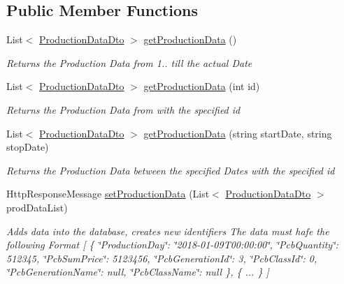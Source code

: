 \subsection*{Public Member Functions}
\begin{DoxyCompactItemize}
\item 
List$<$ \hyperlink{classkpi_mvc_api_1_1_data_transfer_objects_1_1_production_data_dto}{Production\+Data\+Dto} $>$ \hyperlink{classkpi_mvc_api_1_1_controllers_1_1_kpidata_controller_a0ab15672f7d3b5a077a8c4b0612feab8}{get\+Production\+Data} ()
\begin{DoxyCompactList}\small\item\em Returns the Production Data from 1.. till the actual Date \end{DoxyCompactList}\item 
List$<$ \hyperlink{classkpi_mvc_api_1_1_data_transfer_objects_1_1_production_data_dto}{Production\+Data\+Dto} $>$ \hyperlink{classkpi_mvc_api_1_1_controllers_1_1_kpidata_controller_a2cc4fffc5f66a92f16f917715cb36d0e}{get\+Production\+Data} (int id)
\begin{DoxyCompactList}\small\item\em Returns the Production Data from with the specified id \end{DoxyCompactList}\item 
List$<$ \hyperlink{classkpi_mvc_api_1_1_data_transfer_objects_1_1_production_data_dto}{Production\+Data\+Dto} $>$ \hyperlink{classkpi_mvc_api_1_1_controllers_1_1_kpidata_controller_a27722d65abe0781d4b670c84c2e07a76}{get\+Production\+Data} (string start\+Date, string stop\+Date)
\begin{DoxyCompactList}\small\item\em Returns the Production Data between the specified Dates with the specified id \end{DoxyCompactList}\item 
Http\+Response\+Message \hyperlink{classkpi_mvc_api_1_1_controllers_1_1_kpidata_controller_a7f6c6c359f37a9b9a83d481b5c26a037}{set\+Production\+Data} (List$<$ \hyperlink{classkpi_mvc_api_1_1_data_transfer_objects_1_1_production_data_dto}{Production\+Data\+Dto} $>$ prod\+Data\+List)
\begin{DoxyCompactList}\small\item\em Adds data into the database, creates new identifiers The data must hafe the following Format \mbox{[} \{ \char`\"{}\+Production\+Day\char`\"{}\+: \char`\"{}2018-\/01-\/09\+T00\+:00\+:00\char`\"{}, \char`\"{}\+Pcb\+Quantity\char`\"{}\+: 512345, \char`\"{}\+Pcb\+Sum\+Price\char`\"{}\+: 5123456, \char`\"{}\+Pcb\+Generation\+Id\char`\"{}\+: 3, \char`\"{}\+Pcb\+Class\+Id\char`\"{}\+: 0, \char`\"{}\+Pcb\+Generation\+Name\char`\"{}\+: null, \char`\"{}\+Pcb\+Class\+Name\char`\"{}\+: null \}, \{ ... \} \mbox{]} \end{DoxyCompactList}\item 

\end{DoxyCompactItemize}

